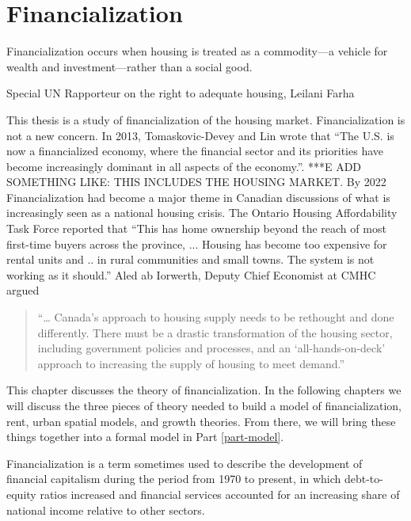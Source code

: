 \chapter{Financialization} \label{chapter-financialization}
\epigraph{Financialization  occurs when housing is treated as a commodity—a vehicle for wealth and investment—rather than a social good.}{Special UN Rapporteur on the right to adequate housing, Leilani Farha}



This thesis is a study of financialization of the housing market. Financialization is not a new concern. In 2013, Tomaskovic-Devey and Lin wrote that ``The U.S. is now a financialized economy, where the financial sector and its priorities have become increasingly dominant in all aspects of the economy.''\cite{tomaskovic-deveyFinancializationCausesInequality2013}. ***E ADD SOMETHING LIKE: THIS INCLUDES THE HOUSING MARKET. By 2022 Financialization had become a major theme in Canadian  discussions of what is increasingly seen as a national housing crisis. The Ontario Housing Affordability Task Force reported that ``This has home ownership beyond the reach of most first-time buyers across the province, ... Housing has become too expensive for rental units and ..  in rural communities and small towns. The system is not working as it should.''   Aled ab Iorwerth, Deputy Chief Economist at CMHC argued
\begin{quotation}
     “… Canada’s approach to housing supply needs to be rethought and done differently. There must be a drastic transformation of the housing sector, including government policies and processes, and an ‘all-hands-on-deck’ approach to increasing the supply of housing to meet demand.”\cite{CanadaHousingSupply2022}
\end{quotation}

This chapter discusses the theory of financialization. In the following chapters we will discuss the three pieces of theory needed to build a model of financialization, rent, urban spatial models, and growth theories. From there, we will bring these things together into a formal model in Part \ref{part-model}.

Financialization is a term %
sometimes used to describe the development of financial capitalism during the period from 1970 to present, in which debt-to-equity ratios increased and financial services accounted for an increasing share of national income relative to other sectors. %

